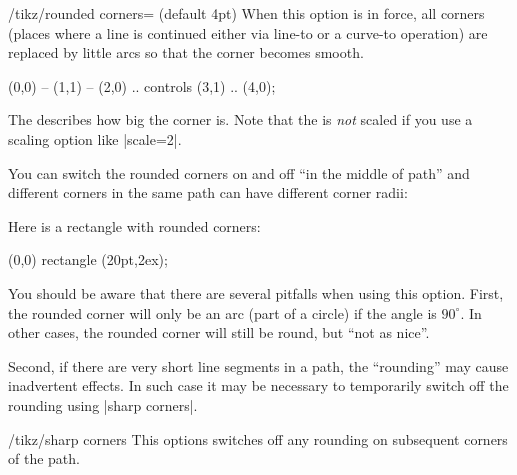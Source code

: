 \begin{key}{/tikz/rounded corners= (default 4pt)}
    When this option is in force, all corners (places where a line is continued
    either via line-to or a curve-to operation) are replaced by little arcs so
    that the corner becomes smooth.
\begin{codeexample}[]
\tikz {} (0,0) -- (1,1)
           -- (2,0) .. controls (3,1) .. (4,0);
\end{codeexample}

    The  describes how big the corner is. Note that the
     is \emph{not} scaled if you use a scaling option like
    |scale=2|.
\begin{codeexample}[]
\end{codeexample}

    You can switch the rounded corners on and off ``in the middle of path'' and
    different corners in the same path can have different corner radii:
\begin{codeexample}[]
\end{codeexample}

    Here is a rectangle with rounded corners:
\begin{codeexample}[]
\tikz \draw[rounded corners=1ex] (0,0) rectangle (20pt,2ex);
\end{codeexample}

    You should be aware that there are several pitfalls when using this
    option. First, the rounded corner will only be an arc (part of a circle) if
    the angle is $90^\circ$. In other cases, the rounded corner will still be
    round, but ``not as nice''.

    Second, if there are very short line segments in a path, the ``rounding''
    may cause inadvertent effects. In such case it may be necessary to
    temporarily switch off the rounding using |sharp corners|.
\end{key}

\begin{key}{/tikz/sharp corners}
    This options switches off any rounding on subsequent corners of the path.
\end{key}


